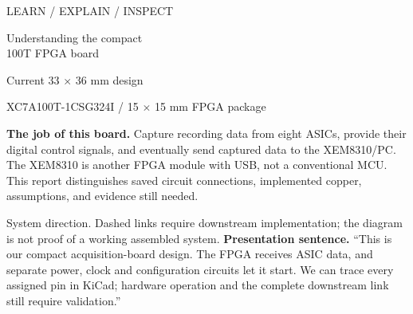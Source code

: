 \documentclass[10pt,a4paper]{article}
\begin{document}
{\color{accent}\small LEARN / EXPLAIN / INSPECT}\par
{\color{ink}\fontsize{26}{30}\selectfont Understanding the compact\\100T FPGA board}\par
{\large Current 33 $\times$ 36 mm design}\par
XC7A100T-1CSG324I / 15 $\times$ 15 mm FPGA package

\textbf{The job of this board.} Capture recording data from eight ASICs, provide their digital control signals, and eventually send captured data to the XEM8310/PC. The XEM8310 is another FPGA module with USB, not a conventional MCU. This report distinguishes saved circuit connections, implemented copper, assumptions, and evidence still needed.

\begin{center}\end{center}
{\small System direction. Dashed links require downstream implementation; the diagram is not proof of a working assembled system.}
\textbf{Presentation sentence.} ``This is our compact acquisition-board design. The FPGA receives ASIC data, and separate power, clock and configuration circuits let it start. We can trace every assigned pin in KiCad; hardware operation and the complete downstream link still require validation.''
\end{document}
